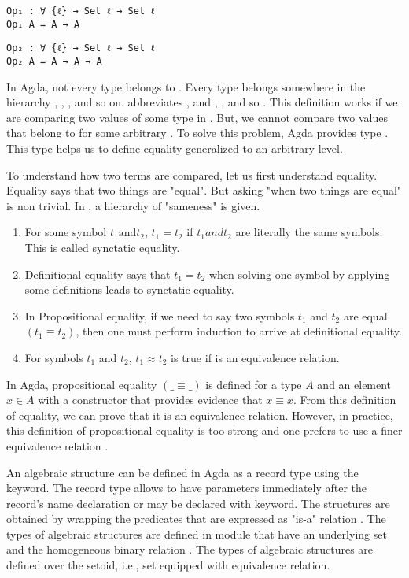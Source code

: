 \begin{verbatim}
Op₁ : ∀ {ℓ} → Set ℓ → Set ℓ
Op₁ A = A → A
\end{verbatim}
\begin{verbatim}
Op₂ : ∀ {ℓ} → Set ℓ → Set ℓ
Op₂ A = A → A → A
\end{verbatim}

In Agda, not every type belongs to . Every type belongs somewhere in
the hierarchy , , , and so on.
 abbreviates , and , , and so  \cite{plfa22.08}. This definition works if we are comparing two
values of some type in . But, we cannot compare two values that
belong to  for some arbitrary . To solve this problem,
Agda provides type . This type helps us to define equality
generalized to an arbitrary level.

To understand how two terms are compared, let us first understand equality.
Equality says that two things are "equal". But asking "when two things are
equal" is non trivial. In \cite{musa}, a hierarchy of "sameness" is given.
\begin{enumerate}
  \item For some symbol $t_1 \text{and} t_2$, $t_1 = t_2$ if $t_1 and t_2$ are
literally the same symbols. This is called synctatic equality.
  \item Definitional equality says that $t_1 = t_2$ when solving one symbol by
  applying some definitions leads to synctatic equality.
  \item In Propositional equality, if we need to say two symbols $t_1$ and $t_2$
  are equal $(t_1 \equiv t_2)$, then one must perform induction to arrive at
  definitional equality.
  \item For symbols $t_1$ and $t_2$, $t_1 \approx t_2$ is true if  is
  an equivalence relation.
\end{enumerate}  

In Agda, propositional equality $(\_ \equiv\_ )$ is defined for a type $A$ and an
element $x \in A$ with a constructor  that provides evidence that
$x \equiv x$. From this definition of equality, we can prove that it is an
equivalence relation. However, in practice, this definition of propositional
equality is too strong and one prefers to use a finer equivalence relation
\cite{musa}. 

An algebraic structure can be defined in Agda as a record type using the
 keyword. The record type allows to have parameters immediately
after the record's name declaration or may be declared with 
keyword. The structures are obtained by wrapping the predicates that are
expressed as "is-a" relation \cite{hu2021formalizing}. The types of algebraic
structures are defined in module  that have an
underlying set  and the homogeneous binary relation . The
types of algebraic structures are defined over the setoid, i.e., set equipped
with equivalence relation. 

